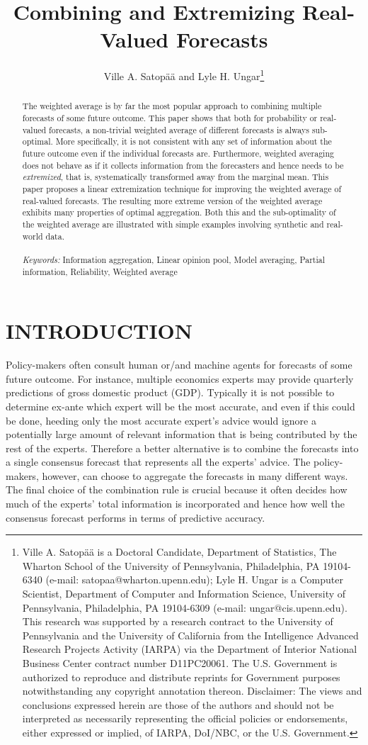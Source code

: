 \documentclass[12pt]{article}
\title{Combining and Extremizing Real-Valued Forecasts}
\author{\vspace{-1em}Ville A. Satop\"a\"a and Lyle H. Ungar\thanks{Ville A. Satop\"a\"a is a Doctoral Candidate, Department of Statistics, The Wharton School of the University of Pennsylvania, Philadelphia, PA 19104-6340 (e-mail: satopaa@wharton.upenn.edu); Lyle H. Ungar is a Computer Scientist, Department of Computer and Information Science, University of Pennsylvania, Philadelphia, PA 19104-6309 (e-mail: ungar@cis.upenn.edu). This research was supported by a research contract to the University
of Pennsylvania and the University of California from the Intelligence
Advanced Research Projects Activity (IARPA) via the Department of
Interior National Business Center contract number D11PC20061. The
U.S. Government is authorized to reproduce and distribute reprints for
Government purposes notwithstanding any copyright annotation
thereon. Disclaimer: The views and conclusions expressed herein are
those of the authors and should not be interpreted as necessarily
representing the official policies or endorsements, either expressed
or implied, of IARPA, DoI/NBC, or the U.S. Government.}}
\date{\vspace{-6.5ex}}
\theoremstyle{definition}
\theoremstyle{definition}
\begin{document}
\maketitle

\begin{abstract}
\singlespace
The weighted average is by far the most popular approach to combining
multiple forecasts of some future outcome. This paper shows that
both for probability or real-valued forecasts, a non-trivial weighted average
of different forecasts is always sub-optimal. More specifically, it is
not consistent with any set of information about the future outcome
even if the individual forecasts are. Furthermore, weighted averaging
does not behave as if it collects information from the forecasters and
hence needs to be \textit{extremized}, that is, 
systematically transformed away from the marginal mean. This paper
proposes a linear extremization technique for improving the weighted
average of real-valued forecasts. The resulting more extreme
version of the weighted average exhibits many properties of optimal
aggregation. Both this and the sub-optimality of the weighted average are illustrated with simple examples involving 
synthetic and real-world data. \\
\\
\textit{Keywords:} Information aggregation, Linear opinion pool, Model averaging, Partial information, Reliability, Weighted average
\end{abstract}

\newpage

\section{INTRODUCTION} \label{introduction}

Policy-makers often consult human or/and machine agents for forecasts
of some future outcome. For instance, multiple economics experts may
provide quarterly predictions of gross domestic product (GDP). Typically it is not possible to determine ex-ante which expert will be the most accurate, and even if this could be done, heeding only the most accurate expert's advice would ignore a potentially large amount of relevant information that is being contributed by the rest of the experts. Therefore a better alternative is to combine the
forecasts into a single consensus forecast that represents all the experts' advice. 
The policy-makers, however, can choose to aggregate the forecasts in many different ways. The final choice of the combination rule is crucial because it often decides how much of the experts' total information is incorporated and hence how well the consensus forecast performs in terms of predictive accuracy.
\end{document}
